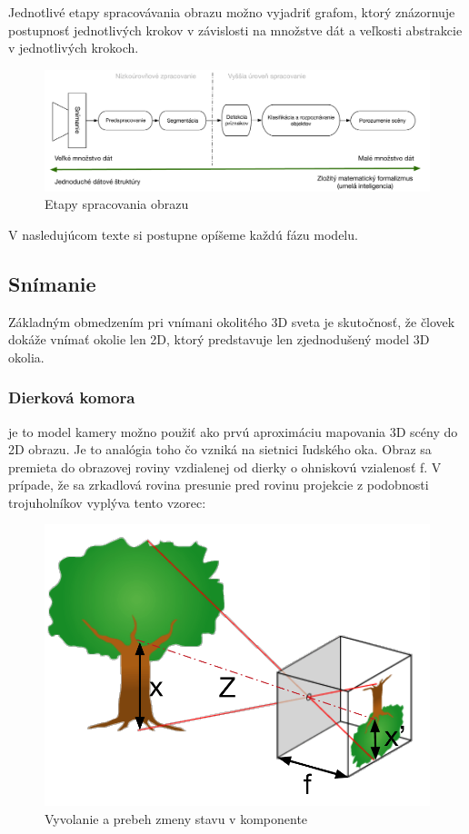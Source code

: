 Jednotlivé etapy spracovávania obrazu možno vyjadriť grafom, ktorý znázornuje postupnosť jednotlivých krokov v závislosti na množstve dát a veľkosti abstrakcie v jednotlivých krokoch. 

\begin{figure}[H]
\begin{center}
	\includegraphics[scale=0.45]{obrazky/etapy}
	\caption{Etapy spracovania obrazu}
	\end{center}
\end{figure}

V nasledujúcom texte si postupne opíšeme každú fázu modelu. 


\subsection{Snímanie}
Základným obmedzením pri vnímani okolitého 3D sveta je skutočnosť, že človek dokáže vnímať okolie len 2D, ktorý predstavuje len zjednodušený model 3D okolia.


\subsubsection{Dierková komora} je to model kamery možno použiť ako prvú aproximáciu mapovania 3D scény do 2D obrazu. Je to analógia toho čo vzniká na sietnici ľudského oka. Obraz sa premieta do obrazovej roviny vzdialenej od dierky o ohniskovú vzialenosť f. V prípade, že sa zrkadlová rovina presunie pred rovinu projekcie z podobnosti trojuholníkov vyplýva tento vzorec:

\begin{figure}[H]
\begin{left}
	\includegraphics[scale=0.4]{obrazky/dierkovaKamera}
	\caption{Vyvolanie a prebeh zmeny stavu v komponente}
	\end{left}
\end{figure}


